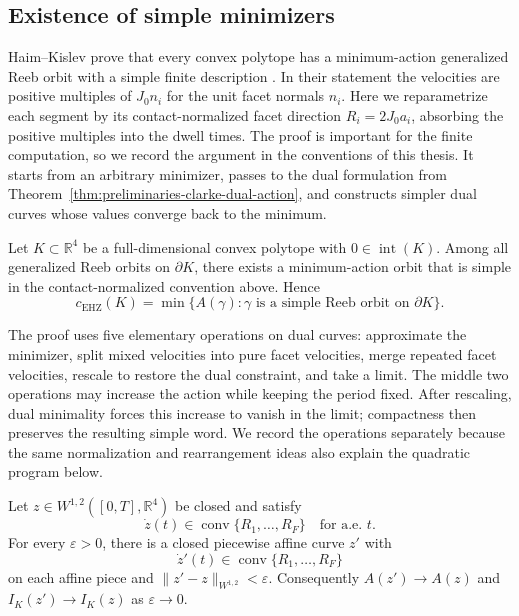 \subsection{Existence of simple minimizers}
\label{subsec:generalized-reeb-orbits-polytopes-existence-of-simple-minimizers}

Haim--Kislev prove that every convex polytope has a minimum-action generalized
Reeb orbit with a simple finite description \cite[Theorem~1.5]{HK2017}. In
their statement the velocities are positive multiples of \(J_0n_i\) for the
unit facet normals \(n_i\). Here we reparametrize each segment by its
contact-normalized facet direction \(R_i=2J_0a_i\), absorbing the positive
multiples into the dwell times. The proof is important for the finite
computation, so we record the argument in the conventions of this thesis. It
starts from an arbitrary minimizer, passes to the dual formulation from
Theorem~\ref{thm:preliminaries-clarke-dual-action}, and constructs simpler
dual curves whose values converge back to the minimum.

\begin{theorem}\label{thm:generalized-reeb-simple-minimizer}
Let \(K\subset\mathbb{R}^4\) be a full-dimensional convex polytope with
\(0\in\operatorname{int}(K)\). Among all generalized Reeb orbits on
\(\partial K\), there exists a minimum-action orbit that is simple in the
contact-normalized convention above. Hence
\[
  c_{\mathrm{EHZ}}(K)
  =
  \min\{A(\gamma):\gamma
  \text{ is a simple Reeb orbit on }\partial K\}.
\]
\end{theorem}

The proof uses five elementary operations on dual curves: approximate the
minimizer, split mixed velocities into pure facet velocities, merge repeated
facet velocities, rescale to restore the dual constraint, and take a limit.
The middle two operations may increase the action while keeping the period
fixed. After rescaling, dual minimality forces this increase to vanish in the
limit; compactness then preserves the resulting simple word. We record the
operations separately because the same normalization and rearrangement ideas
also explain the quadratic program below.

\begin{lemma}\label{lem:generalized-reeb-pw-affine-approx}
Let \(z\in W^{1,2}([0,T],\mathbb{R}^4)\) be closed and satisfy
\[
  \dot z(t)\in\operatorname{conv}\{R_1,\ldots,R_F\}
  \quad\text{for a.e. }t.
\]
For every \(\varepsilon>0\), there is a closed piecewise affine curve \(z'\)
with
\[
  \dot z'(t)\in\operatorname{conv}\{R_1,\ldots,R_F\}
\]
on each affine piece and \(\|z'-z\|_{W^{1,2}}<\varepsilon\). Consequently
\(A(z')\to A(z)\) and \(I_K(z')\to I_K(z)\) as \(\varepsilon\to0\).
\end{lemma}

